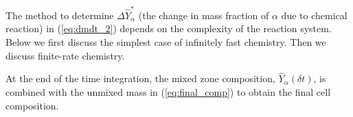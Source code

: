 The method to determine $\Delta \hat{Y}_\alpha^*$ (the change in mass fraction of $\alpha$ due to chemical reaction) in (\ref{eq:dmdt_2}) depends on the complexity of the reaction system.  Below we first discuss the simplest case of infinitely fast chemistry.  Then we discuss finite-rate chemistry.

At the end of the time integration, the mixed zone composition, $\hat{Y}_\alpha(\delta t)$, is combined with the unmixed mass in (\ref{eq:final_comp}) to obtain the final cell composition.

%
%

